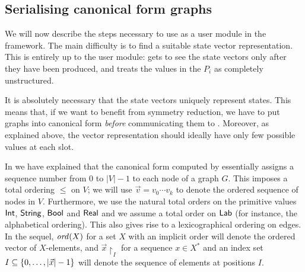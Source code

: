 \subsection{Serialising canonical form graphs}

We will now describe the steps necessary to use \GROOVE as a user module in the
\LTSMIN framework. The main difficulty is to find a suitable state vector
representation. This is entirely up to the user module: \LTSMIN gets to see the
state vectors only after they have been produced, and treats the values in the
$P_i$ as completely unstructured.

It is absolutely necessary that the state vectors uniquely represent
states. This means that, if we want to benefit from symmetry reduction, we have
to put graphs into canonical form \emph{before} communicating them to
\LTSMIN. Moreover, as explained above, the vector representation should ideally
have only few possible values at each slot.

In  we have explained that the canonical form computed by \BLISS
essentially assigns a sequence number from $0$ to $|V|-1$ to each node of a
graph $G$.
This imposes a total ordering $\leq$ on $V$; we will use $\vec
v=v_0\cdots v_k$ to denote the ordered sequence of nodes in $V$. Furthermore,
we use the natural total orders on the primitive values $\mathsf{Int}$, $\mathsf{String}$,
$\mathsf{Bool}$ and $\mathsf{Real}$ and we assume a total order on $\mathsf{Lab}$ (for instance, the
alphabetical ordering). This also gives rise to a lexicographical ordering on
edges. In the sequel, $\mathit{ord}(X)$ for a set $X$ with an implicit order will
denote the ordered vector of $X$-elements, and $\vec x\restriction_I$ for a
sequence $x\in X^*$ and an index set $I\subseteq {\{ 0,\ldots,|\vec x|-1 \}}$
will denote the sequence of elements at positions $I$.

